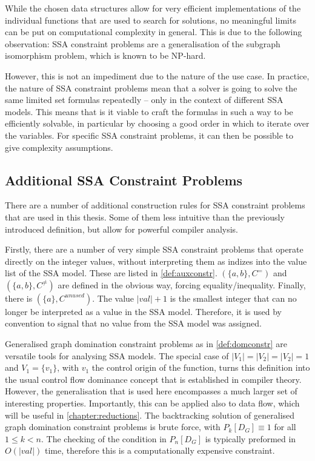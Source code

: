     While the chosen data structures allow for very efficient implementations
    of the individual functions that are used to search for solutions, no
    meaningful limits can be put on computational complexity in general.
    This is due to the following observation:
    SSA constraint problems are a generalisation of the subgraph isomorphism
    problem, which is known to be NP-hard.

    However, this is not an impediment due to the nature of the use case.
    In practice, the nature of SSA constraint problems mean that a solver is
    going to solve the same limited set formulas repeatedly -- only in the
    context of different SSA models.
    This means that is it viable to craft the formulas in such a way to be
    efficiently solvable, in particular by choosing a good order in which to
    iterate over the variables.
    For specific SSA constraint problems, it can then be possible to give
    complexity assumptions.

\subsection{Additional SSA Constraint Problems}

    There are a number of additional construction rules for SSA constraint
    problems that are used in this thesis.
    Some of them less intuitive than the previously introduced definition, but
    allow for powerful compiler analysis.

    Firstly, there are a number of very simple SSA constraint problems that
    operate directly on the integer values, without interpreting them as indizes
    into the value list of the SSA model.
    These are listed in \autoref{def:auxconstr}.
    $(\{a,b\}, C^=)$ and $(\{a,b\}, C^{\neq})$ are defined in the
    obvious way, forcing equality/inequality.
    Finally, there is $(\{a\}, C^{unused})$.
    The value $|val|+1$ is the smallest integer that can no longer be
    interpreted as a value in the SSA model.
    Therefore, it is used by convention to signal that no value from the SSA
    model was assigned.

    Generalised graph domination constraint problems as in
    \autoref{def:domconstr} are versatile tools for analysing SSA models.
    The special case of $|V_1|=|V_2|=|V_2|=1$ and $V_1=\{v_1\}$,
    with $v_1$ the control origin of the function, turns this definition into
    the usual control flow dominance concept that is established in compiler
    theory.
    However, the generalisation that is used here encompasses a much larger
    set of interesting properties.
    Importantly, this can be applied also to data flow, which will be useful in
    \autoref{chapter:reductions}.
    The backtracking solution of generalised graph domination constraint
    problems is brute force, with $P_k[D_G]\equiv 1$ for all $1\leq k<n$.
    The checking of the condition in $P_n[D_G]$ is typically preformed in
    $O(|val|)$ time, therefore this is a computationally expensive constraint.

